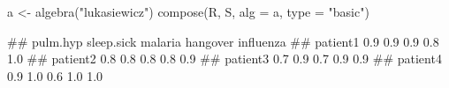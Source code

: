 \begin{Schunk}
% --begin: "comp.basic"
\begin{Sinput}
a <- algebra("lukasiewicz")
compose(R, S, alg = a, type = "basic")
\end{Sinput}
\begin{Soutput}
##          pulm.hyp sleep.sick malaria hangover influenza
## patient1      0.9        0.9     0.9      0.8       1.0
## patient2      0.8        0.8     0.8      0.8       0.9
## patient3      0.7        0.9     0.7      0.9       0.9
## patient4      0.9        1.0     0.6      1.0       1.0
\end{Soutput}
%
% --end: "comp.basic"
\end{Schunk}
